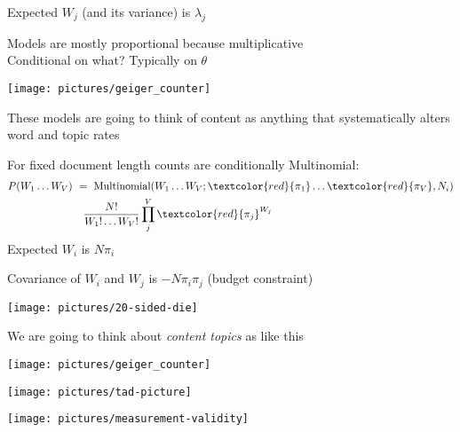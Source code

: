 \documentclass{mediumfoils}
\begin{document}
Expected $W_{j}$ (and its variance) is $\lambda_{j}$

Models are mostly proportional because multiplicative
~\\
Conditional on what?  Typically on $\theta$


\centerline{\texttt{[image: pictures/geiger\_counter]}}


These models are going to think of content as anything that systematically alters word and topic rates



For fixed document length counts are conditionally Multinomial:
\begin{align*}
P(W_{1}\ldots W_{V}) &~=~ \text{Multinomial}(W_{1}\ldots W_{V}; \textcolor{red}{\pi_{1}}\ldots\textcolor{red}{\pi_{V}}, N_i)\\
                     &~~~\frac{N!}{W_{1}!\ldots W_{V}!} \prod^{V}_{j} \textcolor{red}{\pi_{j}}^{W_{j}}
\end{align*}
Expected $W_{i}$ is $N\pi_{i}$

Covariance of $W_{i}$ and $W_{j}$ is $-N \pi_{i}\pi_{j}$ (budget constraint)


\centerline{\texttt{[image: pictures/20-sided-die]}}


We are going to think about \textit{content topics} as like this


\centerline{\texttt{[image: pictures/geiger\_counter]}}


\centerline{\texttt{[image: pictures/tad-picture]}}


\centerline{\texttt{[image: pictures/measurement-validity]}}

%
%
%
%
%
\end{document}
